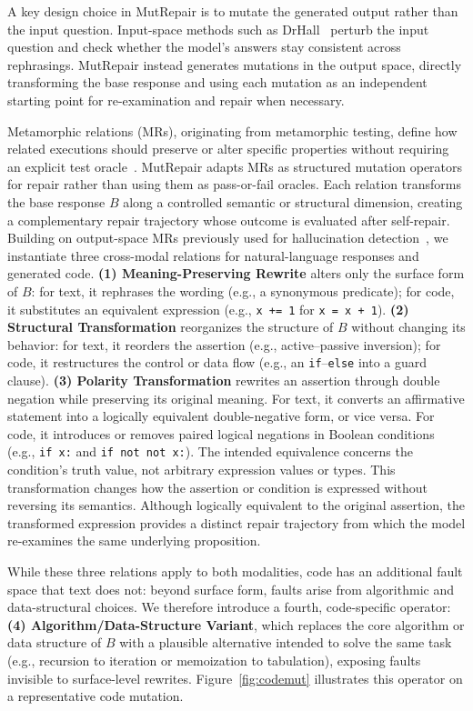 \documentclass[acmsmall,screen,review,anonymous]{acmart}
\begin{document}
A key design choice in MutRepair is to mutate the generated output rather than the input question. Input-space methods such as DrHall~\cite{wu2025detecting} perturb the input question and check whether the model's answers stay consistent across rephrasings. MutRepair instead generates mutations in the output space, directly transforming the base response and using each mutation as an independent starting point for re-examination and repair when necessary.

Metamorphic relations (MRs), originating from metamorphic testing, define how related executions should preserve or alter specific properties without requiring an explicit test oracle~\cite{chen2018metamorphic, zhang2014search, cho2025metamorphic}. MutRepair adapts MRs as structured mutation operators for repair rather than using them as pass-or-fail oracles. Each relation transforms the base response $B$ along a controlled semantic or structural dimension, creating a complementary repair trajectory whose outcome is evaluated after self-repair. Building on output-space MRs previously used for hallucination detection~\cite{yang2025hallucination}, we instantiate three cross-modal relations for natural-language responses and generated code.
\textbf{(1) Meaning-Preserving Rewrite} alters only the surface form of $B$: for text, it rephrases the wording (e.g., a synonymous predicate); for code, it substitutes an equivalent expression (e.g., \texttt{x += 1} for \texttt{x = x + 1}). 
\textbf{(2) Structural Transformation} reorganizes the structure of $B$ without changing its behavior: for text, it reorders the assertion (e.g., active--passive inversion); for code, it restructures the control or data flow (e.g., an \texttt{if}--\texttt{else} into a guard clause). 
\textbf{(3) Polarity Transformation} rewrites an assertion through double negation while preserving its original meaning. For text, it converts an affirmative statement into a logically equivalent double-negative form, or vice versa. For code, it introduces or removes paired logical negations in Boolean conditions (e.g., \texttt{if x:} and \texttt{if not not x:}). The intended equivalence concerns the condition's truth value, not arbitrary expression values or types. This transformation changes how the assertion or condition is expressed without reversing its semantics. Although logically equivalent to the original assertion, the transformed expression provides a distinct repair trajectory from which the model re-examines the same underlying proposition.

While these three relations apply to both modalities, code has an additional fault space that text does not: beyond surface form, faults arise from algorithmic and data-structural choices. We therefore introduce a fourth, code-specific operator: \textbf{(4) Algorithm/Data-Structure Variant}, which replaces the core algorithm or data structure of $B$ with a plausible alternative intended to solve the same task (e.g., recursion to iteration or memoization to tabulation), exposing faults invisible to surface-level rewrites. Figure~\ref{fig:codemut} illustrates this operator on a representative code mutation.
\end{document}
